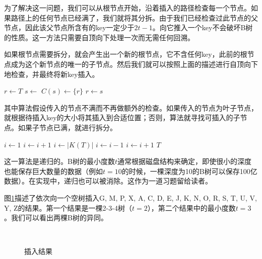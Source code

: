 \documentclass{ctexart}
\begin{document}
为了解决这一问题，我们可以从根节点开始，沿着插入的路径检查每一个节点。如果路径上的任何节点已经满了，我们就将其分拆。由于我们已经检查过此节点的父节点，因此该父节点所含有的key一定少于$2t-1$。向它推入一个key不会破坏B树的性质。这一方法只需要自顶向下处理一次而无需任何回溯。

如果根节点需要拆分，就会产生出一个新的根节点，它不含任何key，此前的根节点成为这个新节点的唯一的子节点。然后我们就可以按照上面的描述进行自顶向下地检查，并最终将新key插入。

\begin{algorithmic}[1]
  \State $r \gets T$
   
    \State $s \gets$ 
    \State $C(s) \gets \{r\}$
    \State {}
    \State $r \gets s$
  \EndIf
  \State \Return {}
\EndFunction
\end{algorithmic}

其中算法假设传入的节点不满而不再做额外的检查。如果传入的节点为叶子节点，就根据待插入key的大小将其插入到合适位置；否则，算法就寻找可插入的子节点。如果子节点已满，就进行拆分。

\begin{algorithmic}[1]
    \State $i \gets 1$
      \State $i \gets i+1$
    \EndWhile
    \State {}
  \Else
    \State $i \gets |K(T)|$
      \State $i \gets i-1$
    \EndWhile
      \State {}
        \State $i \gets i+1$
      \EndIf
    \EndIf
    \State {}
  \EndIf
  \State \Return $T$
\EndFunction
\end{algorithmic}

这一算法是递归的。B树的最小度数$t$通常根据磁盘结构来确定，即使很小的深度也能保存巨大数量的数据（例如$t=10$的时候，一棵深度为10的B树可以保存100亿数据）。在实现中，递归也可以被消除。这作为一道习题留给读者。

图\ref{fig:btree-insert}描述了依次向一个空树插入G, M, P, X, A, C, D, E, J, K, N, O, R, S, T, U, V, Y, Z的结果。第一个结果是一棵2-3-4树（$t=2$），第二个结果中的最小度数$t=3$。我们可以看出两棵B树的异同。

\begin{figure}[htbp]
  \centering
  \\
  \caption{插入结果} \label{fig:btree-insert}
\end{figure}
\end{document}

